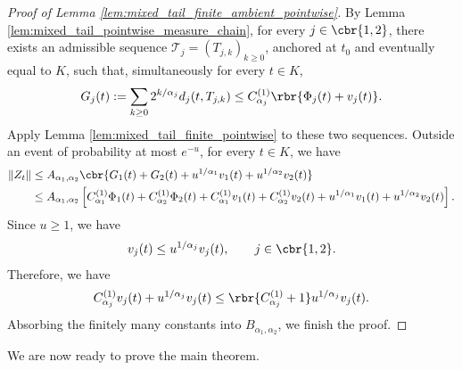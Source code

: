 \documentclass[11pt]{article}
\begin{document}
\begin{proof}[Proof of Lemma
\ref{lem:mixed_tail_finite_ambient_pointwise}]
By Lemma \ref{lem:mixed_tail_pointwise_measure_chain}, for every
$j\in\cbr{1,2}$, there exists an admissible sequence
$\mathcal T_j=(T_{j,k})_{k\ge0}$, anchored at $t_0$ and eventually
equal to $K$, such that, simultaneously for every $t\in K$,
\begin{align*}
G_j(t)
:=
\sum_{k\ge0}
2^{k/\alpha_j}d_j(t,T_{j,k})
\le
C_{\alpha_j}^{(1)}
\rbr{\Phi_j(t)+v_j(t)}.
\end{align*}
Apply Lemma \ref{lem:mixed_tail_finite_pointwise} to these two
sequences. Outside an event of probability at most $e^{-u}$, for every
$t\in K$, we have
\begin{align*}
\|Z_t\|
&\le
A_{\alpha_1,\alpha_2}
\cbr{
G_1(t)+G_2(t)
+
u^{1/\alpha_1}v_1(t)
+
u^{1/\alpha_2}v_2(t)
}\\
&\le
A_{\alpha_1,\alpha_2}
\left[
C_{\alpha_1}^{(1)}\Phi_1(t)
+
C_{\alpha_2}^{(1)}\Phi_2(t)+
C_{\alpha_1}^{(1)}v_1(t)
+
C_{\alpha_2}^{(1)}v_2(t)+
u^{1/\alpha_1}v_1(t)
+
u^{1/\alpha_2}v_2(t)
\right].
\end{align*}
Since $u\ge1$, we have
\begin{align*}
v_j(t)
\le
u^{1/\alpha_j}v_j(t),
\qquad j\in\cbr{1,2}.
\end{align*}
Therefore, we have
\begin{align*}
C_{\alpha_j}^{(1)}v_j(t)
+
u^{1/\alpha_j}v_j(t)
\le
\rbr{C_{\alpha_j}^{(1)}+1}
u^{1/\alpha_j}v_j(t).
\end{align*}
Absorbing the finitely many constants into
$B_{\alpha_1,\alpha_2}$, we finish the proof.
\end{proof}

We are now ready to prove the main theorem.
\end{document}
